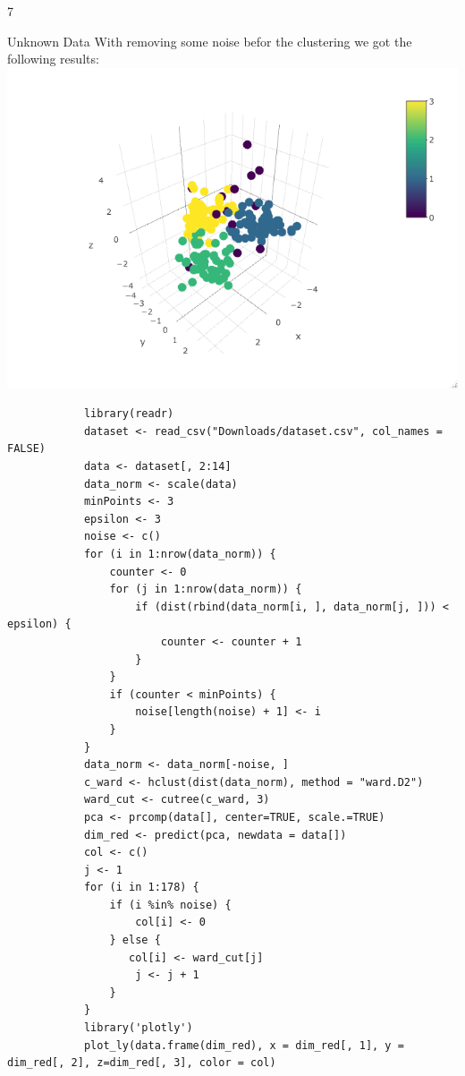 \documentclass{article}
\begin{document}
\begin{ukon-infie}[12.12.17]{7}
\begin{exercise}[p=7]{Unknown Data}
			With removing some noise befor the clustering we got the following results:\\
			\includegraphics[scale=0.6]{pca_cluster_without_noise.png}
			
			\begin{verbatim}
			library(readr)
			dataset <- read_csv("Downloads/dataset.csv", col_names = FALSE)
			data <- dataset[, 2:14]
			data_norm <- scale(data)
			minPoints <- 3
			epsilon <- 3
			noise <- c()
			for (i in 1:nrow(data_norm)) {
			    counter <- 0
			    for (j in 1:nrow(data_norm)) {
			        if (dist(rbind(data_norm[i, ], data_norm[j, ])) < epsilon) {
			            counter <- counter + 1
			        }
			    }
			    if (counter < minPoints) {
			        noise[length(noise) + 1] <- i
			    }
			}
			data_norm <- data_norm[-noise, ]
			c_ward <- hclust(dist(data_norm), method = "ward.D2")
			ward_cut <- cutree(c_ward, 3)
			pca <- prcomp(data[], center=TRUE, scale.=TRUE)
			dim_red <- predict(pca, newdata = data[])
			col <- c()
			j <- 1
			for (i in 1:178) {
			    if (i %in% noise) {
			        col[i] <- 0
			    } else {
			       col[i] <- ward_cut[j]
			        j <- j + 1
			    }
			}
			library('plotly')
			plot_ly(data.frame(dim_red), x = dim_red[, 1], y = dim_red[, 2], z=dim_red[, 3], color = col)
			
			
			\end{verbatim}
		\end{exercise}
		
		
\end{ukon-infie}
\end{document}
